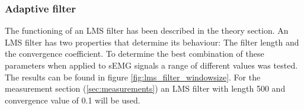 \subsubsection{Adaptive filter}
The functioning of an LMS filter has been described in the theory section. An LMS filter has two properties that determine its behaviour: The filter length and the convergence coefficient. To determine the best combination of these parameters when applied to sEMG signals a range of different values was tested. The results can be found in figure \ref{fig:lms_filter_windowsize}. For the measurement section (\ref{sec:measurements}) an LMS filter with length 500 and convergence value of 0.1 will be used.

